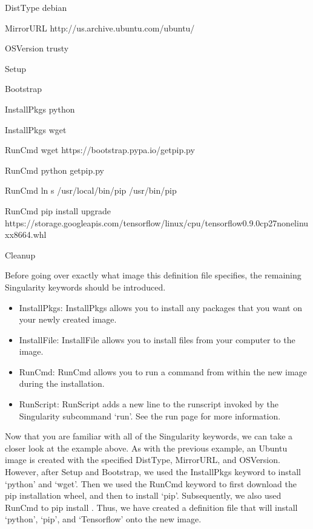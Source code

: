 \documentclass[letterpaper,10pt,english]{sphinxmanual}
\begin{document}
%
\begin{sphinxVerbatim}[commandchars=\\\{\}]
DistType \PYGZdq{}debian\PYGZdq{}

MirrorURL \PYGZdq{}http://us.archive.ubuntu.com/ubuntu/\PYGZdq{}

OSVersion \PYGZdq{}trusty\PYGZdq{}


Setup

Bootstrap


InstallPkgs python

InstallPkgs wget

RunCmd wget https://bootstrap.pypa.io/get\PYGZhy{}pip.py

RunCmd python get\PYGZhy{}pip.py

RunCmd ln \PYGZhy{}s /usr/local/bin/pip /usr/bin/pip

RunCmd pip install \PYGZhy{}\PYGZhy{}upgrade https://storage.googleapis.com/tensorflow/linux/cpu/tensorflow\PYGZhy{}0.9.0\PYGZhy{}cp27\PYGZhy{}none\PYGZhy{}linux\PYGZus{}x86\PYGZus{}64.whl


Cleanup
\end{sphinxVerbatim}

Before going over exactly what image this definition file specifies, the remaining Singularity keywords should be introduced.
\begin{itemize}
\item {} 
InstallPkgs: InstallPkgs allows you to install any packages that you want on your newly created image.

\item {} 
InstallFile: InstallFile allows you to install files from your computer to the image.

\item {} 
RunCmd: RunCmd allows you to run a command from within the new image during the installation.

\item {} 
RunScript: RunScript adds a new line to the runscript invoked by the Singularity subcommand ‘run’. See the run page for more information.

\end{itemize}

Now that you are familiar with all of the Singularity keywords, we can take a closer look at the example above. As with the previous example, an Ubuntu image is created with the specified DistType,
MirrorURL, and OSVersion. However, after Setup and Bootstrap, we used the InstallPkgs keyword to install ‘python’ and ‘wget’. Then we used the RunCmd keyword to first download the pip installation wheel,
and then to install ‘pip’. Subsequently, we also used RunCmd to pip install . Thus, we have created a definition file that will install ‘python’, ‘pip’, and ‘Tensorflow’ onto the new image.
\end{document}
